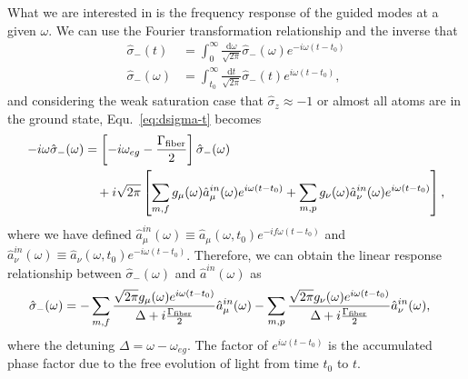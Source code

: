 \documentclass[preprint,aps,pra,onecolumn]{revtex4-1} %
\begin{document}
What we are interested in is the frequency response of the guided modes at a given $\omega$. We can use the Fourier transformation relationship and the inverse that 
\begin{align}
\hat{\sigma}_-(t) &= \int_0^{\infty} \frac{\mathrm{d}\omega}{\sqrt{2\pi}} \hat{\sigma}_-(\omega) e^{-i\omega (t-t_0)}\\
\hat{\sigma}_-(\omega) &= \int_{t_0}^{\infty} \frac{\mathrm{d}t}{\sqrt{2\pi}} \hat{\sigma}_-(t) e^{i\omega (t-t_0)},
\end{align}
and considering the weak saturation case that $\hat{\sigma}_z\approx -1$ or almost all atoms are in the ground state, Equ.~\ref{eq:dsigma-t} becomes
\begin{align}
-i\omega \hat{\sigma}_-(\omega) &= \left[-i\omega_{eg}-\frac{\Gamma_{\rm fiber}}{2} \right]\hat{\sigma}_-(\omega) \nonumber\\
&\quad +i\sqrt{2\pi}\left[ \sum_{m,f} g_\mu(\omega) \hat{a}^{in}_\mu(\omega)e^{i\omega(t-t_0)}+\sum_{m,p} g_\nu(\omega) \hat{a}^{in}_\nu(\omega)e^{i\omega(t-t_0)}\right],
\end{align}
where we have defined $\hat{a}^{in}_\mu(\omega)\equiv \hat{a}_\mu(\omega, t_0)e^{-if\omega(t-t_0)}$ and $\hat{a}^{in}_\nu(\omega)\equiv \hat{a}_\nu(\omega, t_0)e^{-i\omega(t-t_0)}$. 
Therefore, we can obtain the linear response relationship between $\hat{\sigma}_-(\omega)$ and $\hat{a}^{in}(\omega)$ as
\begin{align}\label{eq:sigma-ain}
\hat{\sigma}_-(\omega) &= -\sum_{m,f} \frac{\sqrt{2\pi}g_\mu(\omega)e^{i\omega(t-t_0)}}{\Delta+i\frac{\Gamma_{\rm fiber}}{2}}\hat{a}^{in}_\mu(\omega)-\sum_{m,p} \frac{\sqrt{2\pi}g_\nu(\omega)e^{i\omega(t-t_0)}}{\Delta+i\frac{\Gamma_{\rm fiber}}{2}}\hat{a}^{in}_\nu(\omega),
\end{align}
where the detuning $\Delta=\omega-\omega_{eg}$. The factor of $e^{i\omega(t-t_0)}$ is the accumulated phase factor due to the free evolution of light from time $t_0$ to $t$.
\end{document}
